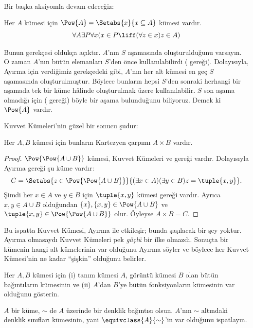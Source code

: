 \documentclass[../../../include/open-logic-section]{subfiles}
\begin{document}

Bir başka aksiyomla devam edeceğiz:

\begin{axiom}
Her $A$ kümesi için $\Pow{A} = \Setabs{x}{x \subseteq A}$ kümesi vardır.
\[
	\forall A \exists P \forall x(x \in P \liff (\forall z \in x)z \in A)
\]
\end{axiom}

Bunun gerekçesi oldukça açıktır. $A$'nın $S$ aşamasında oluşturulduğunu
varsayın. O zaman $A$'nın bütün elemanları $S$'den önce kullanılabilirdi
(\stagesacc{} gereği). Dolayısıyla, Ayırma için verdiğimiz gerekçedeki gibi,
$A$'nın her alt kümesi en geç $S$ aşamasında oluşturulmuştur. Böylece
bunların hepsi $S$'den sonraki herhangi bir aşamada tek bir küme hâlinde
oluşturulmak üzere kullanılabilir. $S$ son aşama olmadığı için
(\stagessucc{} gereği) böyle bir aşama bulunduğunu biliyoruz. Demek ki
$\Pow{A}$ vardır.

Kuvvet Kümeleri'nin güzel bir sonucu şudur:

\begin{prop}\label{thm:Products}
Her $A,B$ kümesi için bunların Kartezyen çarpımı $A \times B$ vardır.
\end{prop}

\begin{proof}
$\Pow{\Pow{A \cup B}}$ kümesi, Kuvvet Kümeleri ve
 gereği vardır. Dolayısıyla
Ayırma gereği şu küme vardır:
\[
	C = \Setabs{z \in \Pow{\Pow{A \cup B}}}{(\exists x \in A)(\exists y \in B) z = \tuple{x, y}}.
\]
Şimdi her $x \in A$ ve $y \in B$ için $\tuple{x,y}$ kümesi
 gereği vardır. Ayrıca
$x,y \in A \cup B$ olduğundan $\{x\}, \{x,y\} \in \Pow{A \cup B}$ ve
$\tuple{x,y} \in \Pow{\Pow{A \cup B}}$ olur. Öyleyse $A \times B=C$.
\end{proof}

Bu ispatta Kuvvet Kümesi, Ayırma ile etkileşir; bunda şaşılacak bir şey
yoktur. Ayırma olmasaydı Kuvvet Kümeleri pek \emph{güçlü} bir ilke
olmazdı. Sonuçta bir kümenin hangi alt kümelerinin var olduğunu Ayırma
söyler ve böylece her Kuvvet Kümesi'nin ne kadar ``şişkin'' olduğunu
belirler.

\begin{prob}
Her $A,B$ kümesi için (i) tanım kümesi $A$, görüntü kümesi $B$ olan bütün
bağıntıların kümesinin ve (ii) $A$'dan $B$'ye bütün fonksiyonların kümesinin
var olduğunu gösterin.
\end{prob}

\begin{prob}
$A$ bir küme, $\sim$ de $A$ üzerinde bir denklik bağıntısı olsun. $A$'nın
$\sim$ altındaki denklik sınıfları kümesinin, yani
$\equivclass{A}{\sim}$'in var olduğunu ispatlayın.
\end{prob}
\end{document}
